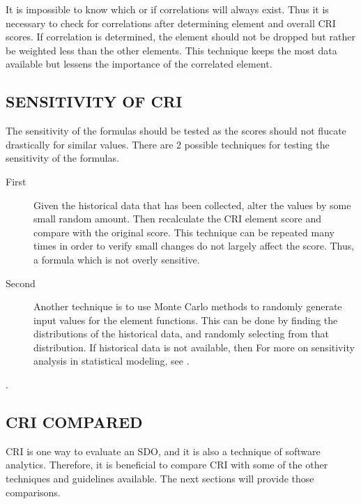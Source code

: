 \documentclass[SDSUThesis.tex]{subfiles}
\begin{document}
        It is impossible to know which or if correlations will always exist.  Thus it is necessary to
        check for correlations after determining element and overall CRI scores.  
        If correlation is determined, the element should not be dropped but rather be weighted less than
        the other elements.  This technique keeps the most data available but lessens the importance of
        the correlated element. 
        
    \subsection{SENSITIVITY OF CRI}
    \label{sub:sensitivity}
        The sensitivity of the formulas should be tested as the scores should not
        flucate drastically for similar values.  There are 2 possible techniques
        for testing the sensitivity of the formulas. 
        \begin{description}
            \item[First] Given the historical data that has been collected,
                alter the values by some small random amount.  Then recalculate
                the CRI element score and compare with the original score.  This
                technique can be repeated many times in order to verify
                small changes do not largely affect the score.  Thus, a 
                formula which is not overly sensitive. 
            \item[Second] Another technique is to use Monte Carlo methods to 
                randomly generate input values for the element functions.  
                This can be done by finding the distributions of the historical
                data, and randomly selecting from that distribution.  If historical
                data is not available, then For more on sensitivity analysis 
                in statistical modeling, see \cite{Saltelli2000}.
        \end{description}
        
        .

    \subsection{CRI COMPARED}
        CRI is one way to evaluate an SDO, and it is also a technique of
        software analytics.  Therefore, it is beneficial to compare CRI
        with some of the other techniques and guidelines available. The
        next sections will provide those comparisons.
    
\end{document}
